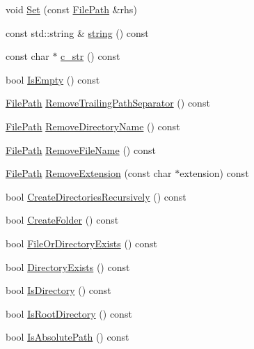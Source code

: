 \begin{DoxyCompactItemize}
\item 
void \hyperlink{classtesting_1_1internal_1_1_file_path_a15a42de7518e89254e0640dd9317d5f7}{Set} (const \hyperlink{classtesting_1_1internal_1_1_file_path}{File\-Path} \&rhs)
\item 
const std\-::string \& \hyperlink{classtesting_1_1internal_1_1_file_path_a7c544a30af67e2da5ce7e625f8402818}{string} () const 
\item 
const char $\ast$ \hyperlink{classtesting_1_1internal_1_1_file_path_a85297234dac0acd936632dff8634c2b9}{c\-\_\-str} () const 
\item 
bool \hyperlink{classtesting_1_1internal_1_1_file_path_a44543ff34ae757038ab20925659b447a}{Is\-Empty} () const 
\item 
\hyperlink{classtesting_1_1internal_1_1_file_path}{File\-Path} \hyperlink{classtesting_1_1internal_1_1_file_path_a952e1b2a9909cdeaf25de5fcdf069b3a}{Remove\-Trailing\-Path\-Separator} () const 
\item 
\hyperlink{classtesting_1_1internal_1_1_file_path}{File\-Path} \hyperlink{classtesting_1_1internal_1_1_file_path_a2852e5a759ff2e2620c7317b8121d757}{Remove\-Directory\-Name} () const 
\item 
\hyperlink{classtesting_1_1internal_1_1_file_path}{File\-Path} \hyperlink{classtesting_1_1internal_1_1_file_path_aed3abcd0b8a7f6ed1ff0e7743ef8bf1e}{Remove\-File\-Name} () const 
\item 
\hyperlink{classtesting_1_1internal_1_1_file_path}{File\-Path} \hyperlink{classtesting_1_1internal_1_1_file_path_ab2a25cc916c111597b94d006aa973c3d}{Remove\-Extension} (const char $\ast$extension) const 
\item 
bool \hyperlink{classtesting_1_1internal_1_1_file_path_afccf35a45e209c22e68c6f8e86036c12}{Create\-Directories\-Recursively} () const 
\item 
bool \hyperlink{classtesting_1_1internal_1_1_file_path_a303cdda61bee6e8a0b0303e8fc857e36}{Create\-Folder} () const 
\item 
bool \hyperlink{classtesting_1_1internal_1_1_file_path_a3548d3ead0e94701669afc64d765ece7}{File\-Or\-Directory\-Exists} () const 
\item 
bool \hyperlink{classtesting_1_1internal_1_1_file_path_a3546b3f926935fefddb9a808e7e2be47}{Directory\-Exists} () const 
\item 
bool \hyperlink{classtesting_1_1internal_1_1_file_path_a918336f16efa8e07d4b94192d6a89f44}{Is\-Directory} () const 
\item 
bool \hyperlink{classtesting_1_1internal_1_1_file_path_a7d31c82f3f979c54e5a985382b52feb1}{Is\-Root\-Directory} () const 
\item 
bool \hyperlink{classtesting_1_1internal_1_1_file_path_a720a5f0fd00f3e98d6f3518f4dadfff5}{Is\-Absolute\-Path} () const 
\end{DoxyCompactItemize}
